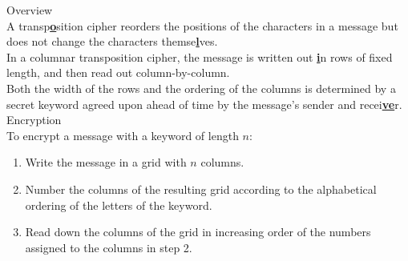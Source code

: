 \begin{minipage}{6cm}\raggedright
\textsf{\LARGE Overview}\\[1.0ex]

A transp\underline{\textbf{o}}sition cipher reorders the positions of the characters in a message but does not change the characters themse\underline{\textbf{l}}ves.\\[1.25ex]

In a columnar transposition cipher, the message is written out \underline{\textbf{i}}n rows of fixed length, and then read out column-by-column.\\[1.25ex]

Both the width of the rows and the ordering of the columns is determined by a secret keyword agreed upon ahead of time by the message's sender and recei\underline{\textbf{ve}}r.\\[3.0ex]

\textsf{\LARGE Encryption}\\[1.0ex]

To encrypt a message with a keyword of length $n$:
\begin{enumerate}[leftmargin=*]
	\item Write the message in a grid with $n$ columns.\\[1.25ex]
	\item Number the columns of the resulting  grid according to the alphabetical ordering of the letters of the keyword.
	\item Read down the columns of the grid in increasing order of the numbers assigned to the columns in step 2.
\end{enumerate}
%
%
%
%
%
%
\end{minipage}